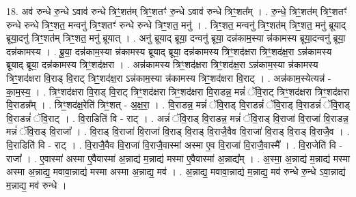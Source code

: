 \documentclass[17pt]{extarticle}
\begin{document}
18. अव॑ रुन्धे रु॒न्धे ऽवाव॑ रुन्धे त्रिꣳ॒॒शत॑म् त्रिꣳ॒॒शतꣳ॑ रु॒न्धे ऽवाव॑ रुन्धे त्रिꣳ॒॒शत᳚म् । . रु॒न्धे॒ त्रिꣳ॒॒शत॑म् त्रिꣳ॒॒शतꣳ॑ रुन्धे रुन्धे त्रिꣳ॒॒शत॒ मन्वनु॑ त्रिꣳ॒॒शतꣳ॑ रुन्धे रुन्धे त्रिꣳ॒॒शत॒ मनु॑ । . त्रिꣳ॒॒शत॒ मन्वनु॑ त्रिꣳ॒॒शत॑म् त्रिꣳ॒॒शत॒ मनु॑ ब्रूयाद् ब्रूया॒दनु॑ त्रिꣳ॒॒शत॑म् त्रिꣳ॒॒शत॒ मनु॑ ब्रूयात् । . अनु॑ ब्रूयाद् ब्रूया॒ दन्वनु॑ ब्रूया॒ दन्न॑काम॒स्या न्न॑कामस्य ब्रूया॒दन्वनु॑ ब्रूया॒ दन्न॑कामस्य । . ब्रू॒या॒ दन्न॑काम॒स्या न्न॑कामस्य ब्रूयाद् ब्रूया॒ दन्न॑कामस्य त्रिꣳ॒॒शद॑क्षरा त्रिꣳ॒॒शद॑क्ष॒रा ऽन्न॑कामस्य ब्रूयाद् ब्रूया॒ दन्न॑कामस्य त्रिꣳ॒॒शद॑क्षरा । . अन्न॑कामस्य त्रिꣳ॒॒शद॑क्षरा त्रिꣳ॒॒शद॑क्ष॒रा ऽन्न॑काम॒स्या न्न॑कामस्य त्रिꣳ॒॒शद॑क्षरा वि॒राड् वि॒राट् त्रिꣳ॒॒शद॑क्ष॒रा ऽन्न॑काम॒स्या न्न॑कामस्य त्रिꣳ॒॒शद॑क्षरा वि॒राट् । . अन्न॑काम॒स्येत्यन्न॑ - का॒म॒स्य॒ । . त्रिꣳ॒॒शद॑क्षरा वि॒राड् वि॒राट् त्रिꣳ॒॒शद॑क्षरा त्रिꣳ॒॒शद॑क्षरा वि॒राडन्न॒ मन्नं॑ ॅवि॒राट् त्रिꣳ॒॒शद॑क्षरा त्रिꣳ॒॒शद॑क्षरा वि॒राडन्न᳚म् । . त्रिꣳ॒॒शद॑क्ष॒रेति॑ त्रिꣳ॒॒शत् - अ॒क्ष॒रा॒ । . वि॒राडन्न॒ मन्नं॑ ॅवि॒राड् वि॒राडन्नं॑ ॅवि॒राड् वि॒राडन्नं॑ ॅवि॒राड् वि॒राडन्नं॑ ॅवि॒राट् । . वि॒राडिति॑ वि - राट् । . अन्नं॑ ॅवि॒राड् वि॒राडन्न॒ मन्नं॑ ॅवि॒राड् वि॒राजा॑ वि॒राजा॑ वि॒राडन्न॒ मन्नं॑ ॅवि॒राड् वि॒राजा᳚ । . वि॒राड् वि॒राजा॑ वि॒राजा॑ वि॒राड् वि॒राड् वि॒राजै॒वैव वि॒राजा॑ वि॒राड् वि॒राड् वि॒राजै॒व । . वि॒राडिति॑ वि - राट् । . वि॒राजै॒वैव वि॒राजा॑ वि॒राजै॒वास्मा॑ अस्मा ए॒व वि॒राजा॑ वि॒राजै॒वास्मै᳚ । . वि॒राजेति॑ वि - राजा᳚ । . ए॒वास्मा॑ अस्मा ए॒वैवास्मा॑ अ॒न्नाद्य॑ म॒न्नाद्य॑ मस्मा ए॒वैवास्मा॑ अ॒न्नाद्य᳚म् । . अ॒स्मा॒ अ॒न्नाद्य॑ म॒न्नाद्य॑ मस्मा अस्मा अ॒न्नाद्य॒ मवावा॒न्नाद्य॑ मस्मा अस्मा अ॒न्नाद्य॒ मव॑ । . अ॒न्नाद्य॒ मवावा॒न्नाद्य॑ म॒न्नाद्य॒ मव॑ रुन्धे रु॒न्धे ऽवा॒न्नाद्य॑ म॒न्नाद्य॒ मव॑ रुन्धे । \newline
\end{document}
